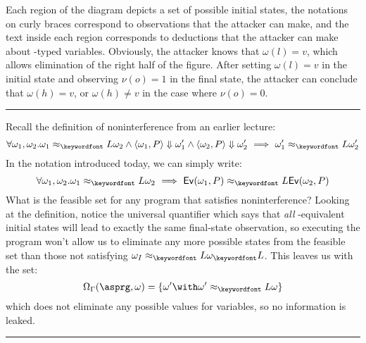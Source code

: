 \documentclass[11pt,twoside]{scrartcl}
\begin{document}
\begin{example}
\begin{center}
{
}
\end{center}
Each region of the diagram depicts a set of possible initial states, the notations on curly braces correspond to observations that the attacker can make, and the text inside each region corresponds to deductions that the attacker can make about \hisec-typed variables. Obviously, the attacker knows that $\omega(l) = v$, which allows elimination of the right half of the figure. After setting $\omega(l) = v$ in the initial state and observing $\nu(o) = 1$ in the final state, the attacker can conclude that $\omega(h) = v$, or $\omega(h) \ne v$ in the case where $\nu(o) = 0$.
\hfill\rule{2mm}{2mm}
\end{example}

\begin{example}
Recall the definition of noninterference from an earlier lecture:
\[
\forall \omega_1, \omega_2 . \omega_1 \approx_\lowsec \omega_2 \land \langle \omega_1, P \rangle \Downarrow \omega_1' \land \langle \omega_2, P \rangle \Downarrow \omega_2'\ \Longrightarrow\ \omega_1' \approx_\lowsec \omega_2'
\]
In the notation introduced today, we can simply write:
\[
\forall \omega_1, \omega_2 . \omega_1 \approx_\lowsec \omega_2\ \Longrightarrow\ \eval{\omega_1}{P} \approx_\lowsec \eval{\omega_2}{P}
\]
What is the feasible set for any program that satisfies noninterference?
Looking at the definition, notice the universal quantifier which says that \emph{all} \lowsec-equivalent initial states will lead to exactly the same final-state observation, so executing the program won't allow us to eliminate any more possible states from the feasible set than those not satisfying $\omega_I \approx_\lowsec \omega_\lowsec$. This leaves us with the set:
\[
\Omega_\Gamma(\asprg,\omega) = \{ \omega' \with \omega' \approx_\lowsec \omega \}
\]
which does not eliminate any possible values for \hisec variables, so no information is leaked.
\hfill\rule{2mm}{2mm}
\end{example}
\end{document}
